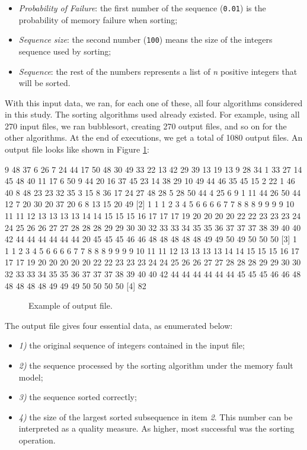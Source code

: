 \begin{itemize}
    \item \textit{Probability of Failure}: the first number of the sequence (\texttt{0.01}) is the probability of memory failure when sorting;
    \item \textit{Sequence size}: the second number (\texttt{100}) means the size of the integers sequence used by sorting;
    \item \textit{Sequence}: the rest of the numbers represents a list of \textit{n} positive integers that will be sorted.
\end{itemize}

With this input data, we ran, for each one of these, all four algorithms considered in this study. The sorting algorithms used already existed. For example, using all 270 input files, we ran bubblesort, creating 270 output files, and so on for the other algorithms. At the end of executions, we get a total of 1080 output files. An output file looks like shown in Figure \ref{fig-output-file-example}:

\begin{verbbox}[\mbox{}]
[1]  9 48 37 6 26 7 24 44 17 50 48 30 49 33 22 13 42 29 39 13 19 13 9 28 34 1
33 27 14 45 48 40 11 17 6 50 9 44 20 16 37 45 23 14 38 29 10 49 44 46 35 45  
15 2 22 1 46 40 8 48 23 23 32 35 3 15 8 36 17 24 27 48 28 5 28 50 44 4 25 6 9
1 11 44 26 50 44 12 7 20 30 20 37 20 6 8 13 15 20 49
[2]  1 1 1 2 3 4 5 6 6 6 6 7 7 8 8 8 9 9 9 9 10 11 11 12 13 13 13 13 14 14 15 
15 15 16 17 17 17 19 20 20 20 20 22 22 23 23 23 24 24 25 26 26 27 27 28 28 28 
29 29 30 30 32 33 33 34 35 35 36 37 37 37 38 39 40 40 42 44 44 44 44 44 44 20 
45 45 45 46 46 48 48 48 48 48 49 49 50 49 50 50 50
[3]  1 1 1 2 3 4 5 6 6 6 6 7 7 8 8 8 9 9 9 9 10 11 11 12 13 13 13 13 14 14 15 
15 15 16 17 17 17 19 20 20 20 20 20 22 22 23 23 23 24 24 25 26 26 27 27 28 28 
28 29 29 30 30 32 33 33 34 35 35 36 37 37 37 38 39 40 40 42 44 44 44 44 44 44 
45 45 45 46 46 48 48 48 48 48 49 49 49 50 50 50 50
[4]  82
\end{verbbox}
    
\begin{figure}[H]
    \centering
    \fbox{
    \theverbbox
    }
    \caption{Example of output file.}
    \label{fig-output-file-example}
\end{figure}

The output file gives four essential data, as enumerated below:
\begin{itemize}
    \item \textit{1)} the original sequence of integers contained in the input file;
    \item \textit{2)} the sequence processed by the sorting algorithm under the memory fault model;
    \item \textit{3)} the sequence sorted correctly;
    \item \textit{4)} the size of the largest sorted subsequence in item \textit{2}. This number can be interpreted as a quality measure. As higher, most successful was the sorting operation.
\end{itemize}

